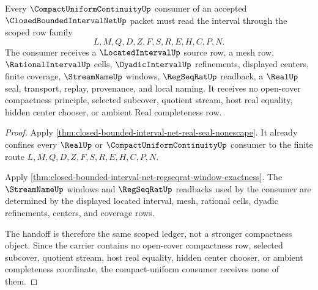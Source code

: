 \begin{theorem}
\label{thm:closed-bounded-interval-net-compactuniformconsumer-handoff}
Every $\CompactUniformContinuityUp$ consumer of an accepted $\ClosedBoundedIntervalNetUp$ packet must read the interval through the scoped row family
$$
L,M,Q,D,Z,F,S,R,E,H,C,P,N.
$$
The consumer receives a $\LocatedIntervalUp$ source row, a mesh row, $\RationalIntervalUp$ cells, $\DyadicIntervalUp$ refinements, displayed centers, finite coverage, $\StreamNameUp$ windows, $\RegSeqRatUp$ readback, a $\RealUp$ seal, transport, replay, provenance, and local naming. It receives no open-cover compactness principle, selected subcover, quotient stream, host real equality, hidden center chooser, or ambient Real completeness row.
\end{theorem}
\begin{proof}
Apply \autoref{thm:closed-bounded-interval-net-real-seal-nonescape}. It already confines every $\RealUp$ or $\CompactUniformContinuityUp$ consumer to the finite route $L,M,Q,D,Z,F,S,R,E,H,C,P,N$.

Apply \autoref{thm:closed-bounded-interval-net-regseqrat-window-exactness}. The $\StreamNameUp$ windows and $\RegSeqRatUp$ readbacks used by the consumer are determined by the displayed located interval, mesh, rational cells, dyadic refinements, centers, and coverage rows.

The handoff is therefore the same scoped ledger, not a stronger compactness object. Since the carrier contains no open-cover compactness row, selected subcover, quotient stream, host real equality, hidden center chooser, or ambient completeness coordinate, the compact-uniform consumer receives none of them.
\end{proof}

